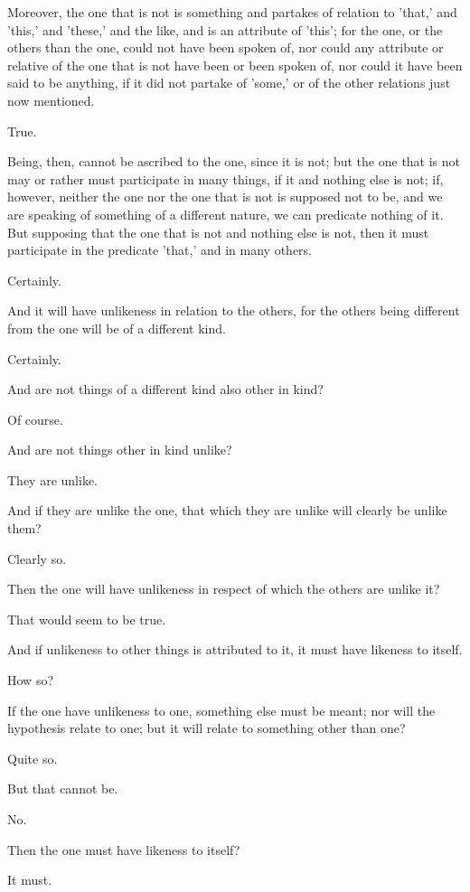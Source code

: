Moreover, the one that is not is something and partakes of relation to
'that,' and 'this,' and 'these,' and the like, and is an attribute of
'this'; for the one, or the others than the one, could not have been
spoken of, nor could any attribute or relative of the one that is not
have been or been spoken of, nor could it have been said to be anything,
if it did not partake of 'some,' or of the other relations just now
mentioned.

True.

Being, then, cannot be ascribed to the one, since it is not; but the
one that is not may or rather must participate in many things, if it and
nothing else is not; if, however, neither the one nor the one that
is not is supposed not to be, and we are speaking of something of a
different nature, we can predicate nothing of it. But supposing that the
one that is not and nothing else is not, then it must participate in the
predicate 'that,' and in many others.

Certainly.

And it will have unlikeness in relation to the others, for the others
being different from the one will be of a different kind.

Certainly.

And are not things of a different kind also other in kind?

Of course.

And are not things other in kind unlike?

They are unlike.

And if they are unlike the one, that which they are unlike will clearly
be unlike them?

Clearly so.

Then the one will have unlikeness in respect of which the others are
unlike it?

That would seem to be true.

And if unlikeness to other things is attributed to it, it must have
likeness to itself.

How so?

If the one have unlikeness to one, something else must be meant; nor
will the hypothesis relate to one; but it will relate to something other
than one?

Quite so.

But that cannot be.

No.

Then the one must have likeness to itself?

It must.

